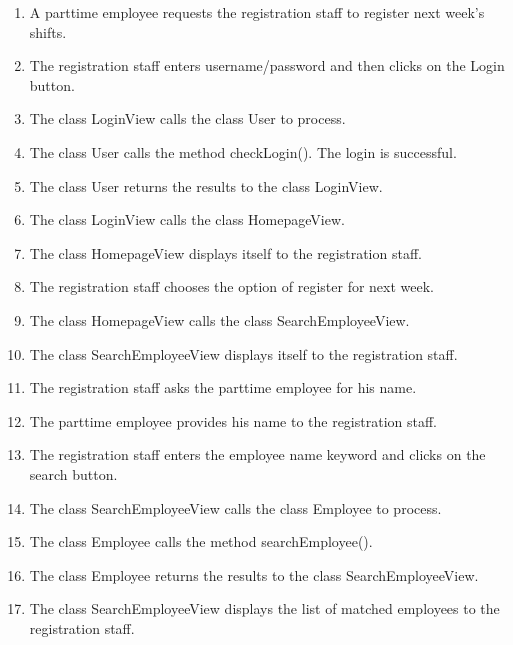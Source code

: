 \begin{enumerate}
    \item A parttime employee requests the registration staff to register next week's shifts.

    \item The registration staff enters username/password and then clicks on the Login button.

    \item The class LoginView calls the class User to process.

    \item The class User calls the method checkLogin(). The login is successful.

    \item The class User returns the results to the class LoginView.

    \item The class LoginView calls the class HomepageView.

    \item The class HomepageView displays itself to the registration staff.

    \item The registration staff chooses the option of register for next week.

    \item The class HomepageView calls the class SearchEmployeeView.

    \item The class SearchEmployeeView displays itself to the registration staff.

    \item The registration staff asks the parttime employee for his name.

    \item The parttime employee provides his name to the registration staff.

    \item The registration staff enters the employee name keyword and clicks on the search button.

    \item The class SearchEmployeeView calls the class Employee to process.

    \item The class Employee calls the method searchEmployee().

    \item The class Employee returns the results to the class SearchEmployeeView.

    \item The class SearchEmployeeView displays the list of matched employees to the registration staff.


\end{enumerate}
